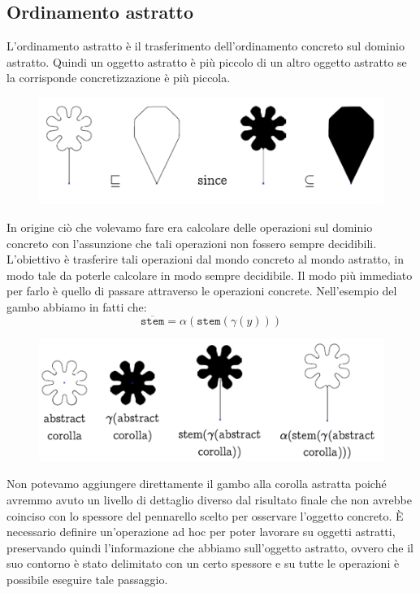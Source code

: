 \subsection{Ordinamento astratto}
L'ordinamento astratto è il trasferimento dell'ordinamento concreto
sul dominio astratto. Quindi un oggetto astratto è più piccolo di un altro
oggetto astratto se la corrisponde concretizzazione è più piccola.
\begin{figure}[H]
    \centering
    \includegraphics[scale=0.6]{img/abstractordering.png}
\end{figure}
In origine ciò che volevamo fare era calcolare delle operazioni sul dominio concreto 
con l'assunzione che tali operazioni non fossero sempre decidibili. L'obiettivo 
è trasferire tali operazioni dal mondo concreto al mondo astratto, in modo tale
da poterle calcolare in modo sempre decidibile.
Il modo più immediato per farlo è quello di passare attraverso le operazioni concrete.
Nell'esempio del gambo abbiamo in fatti che:
\[
    \overline{\texttt{stem}} = \alpha (\texttt{stem} (\gamma(y)))
\]
\begin{figure}[H]
    \centering
    \includegraphics[scale=0.6]{img/abstractstem.png}
\end{figure}
Non potevamo aggiungere direttamente il gambo alla corolla astratta 
poiché avremmo avuto un livello di dettaglio diverso dal risultato finale 
che non avrebbe coinciso con lo spessore del pennarello scelto per 
osservare l'oggetto concreto.
È necessario definire un'operazione ad hoc per
poter lavorare su oggetti astratti, preservando quindi l'informazione che 
abbiamo sull'oggetto astratto, ovvero che il suo contorno è stato delimitato 
con un certo spessore e su tutte le operazioni è possibile eseguire 
tale passaggio.
